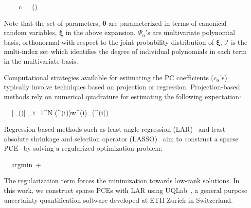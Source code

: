 \be
{} = \sum_{\alpha\in{}} c_{\alpha}\Psi_{\alpha}(\bm{\xi(\theta)}) 
\ee

Note that the set of parameters, $\bm{\theta}$ are parameterized in terms of canonical random
variables, $\bm{\xi}$ in the above expansion. $\Psi_{\alpha}$'s are multivariate polynomial
basis, orthonormal with respect to the joint probability distribution of $\bm{\xi}$, $\mathcal{I}$
is the multi-index set which identifies the degree of individual polynomials in each term in the
multivariate basis.

Computational strategies available for estimating the PC coefficients ($c_\alpha$'s) typically involve
techniques based on projection or regression. Projection-based methods rely on numerical
quadrature for estimating the following expectation:

\be
{} = [\Psi_\alpha(\bm{\xi})\cdot{}]
\approx
\sum_{i=1}^{N} (\bm{\theta}^{(i)})w^{(i)}\Psi_\alpha(\bm{\xi}^{(i)})
\ee

Regression-based methods such as least angle regression (LAR)~\cite{Efron:2004} and least absolute shrinkage
and selection operator (LASSO)~\cite{Tibshirani:1996} aim to construct a sparse PCE~\cite{Blatman:2008}
by solving a regularized optimization problem:

\be
{} = \mbox{argmin}~  + \lambda{}
\ee

The regularization term forces the minimization towards low-rank solutions.
In this work, we construct sparse PCEs with LAR using UQLab~\cite{Marelli:2014},
a general purpose uncertainty quantification software developed at ETH Zurich in Switzerland.


















